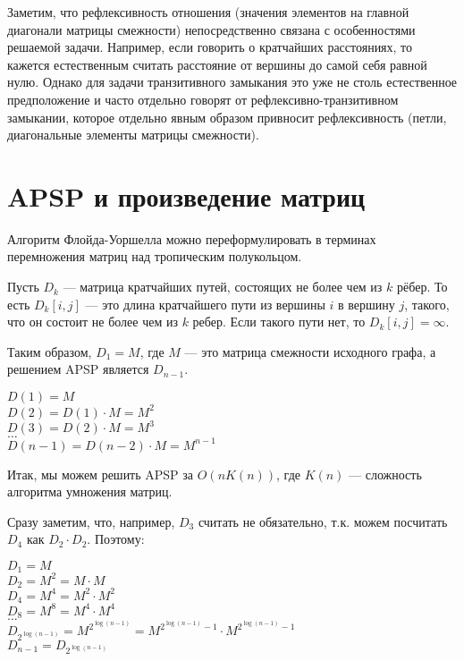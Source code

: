 Заметим, что рефлексивность отношения (значения элементов на главной диагонали матрицы смежности) непосредственно связана с особенностями решаемой задачи. Например, если говорить о кратчайших расстояниях, то кажется естественным считать расстояние от вершины до самой себя равной нулю. Однако для задачи транзитивного замыкания это уже не столь естественное предположение и часто отдельно говорят от рефлексивно-транзитивном замыкании, которое отдельно явным образом привносит рефлексивность (петли, диагональные элементы матрицы смежности).



\section{APSP и произведение матриц}

Алгоритм Флойда-Уоршелла можно переформулировать в терминах перемножения матриц над тропическим полукольцом.

Пусть $D_k$ --- матрица кратчайших путей, состоящих не более чем из $k$ рёбер. То есть $D_k[i,j]$ --- это длина кратчайшего пути из вершины $i$ в вершину $j$, такого, что он состоит не более чем из $k$ ребер. Если такого пути нет, то $D_k[i,j] = \infty$.

Таким образом, $D_1 = M$, где $M$ --- это матрица смежности исходного графа, а решением APSP является $D_{n-1}$.

\begin{center}
    $D(1) = M$ \\
    $D(2) = D(1) \cdot M = M^2$ \\
    $D(3) = D(2) \cdot M = M^3$ \\
    $\dots$ \\
    $D(n-1) = D(n-2) \cdot M = M^{n-1}$ \\
\end{center}

Итак, мы можем решить APSP за $O(n K(n))$, где $K(n)$ --- сложность алгоритма умножения матриц.

Сразу заметим, что, например, $D_3$ считать не обязательно, т.к. можем посчитать $D_4$ как $D_2 \cdot D_2$.
Поэтому:

\begin{center}
    $D_1 = M$ \\
    $D_2 = M^2 = M \cdot M$ \\
    $D_4 = M^4 = M^2 \cdot M^2$ \\
    $D_8 = M^8 = M^4 \cdot M^4$ \\
    $\dots$ \\
    $D_{2^{\log(n-1)}} = M^{2^{\log(n-1)}} = M^{2^{\log(n-1)} - 1} \cdot M^{2^{\log(n-1)} - 1}$ \\
    $D_{n-1} = D_{2^{\log(n-1)}}$ \\
\end{center}

